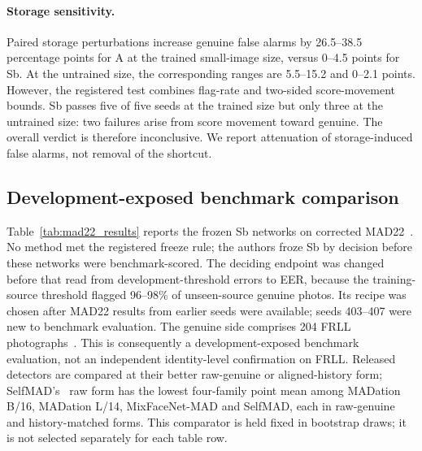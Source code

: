 \paragraph{Storage sensitivity.}
Paired storage perturbations increase genuine false alarms by 26.5--38.5 percentage points for A at the trained small-image size, versus 0--4.5 points for Sb. At the untrained size, the corresponding ranges are 5.5--15.2 and 0--2.1 points. However, the registered test combines flag-rate and two-sided score-movement bounds. Sb passes five of five seeds at the trained size but only three at the untrained size: two failures arise from score movement toward genuine. The overall verdict is therefore inconclusive. We report attenuation of storage-induced false alarms, not removal of the shortcut.

\subsection{Development-exposed benchmark comparison}
\label{sec:mad22_results}
Table~\ref{tab:mad22_results} reports the frozen Sb networks on corrected MAD22~\cite{huber2022synmad}. No method met the registered freeze rule; the authors froze Sb by decision before these networks were benchmark-scored. The deciding endpoint was changed before that read from development-threshold errors to EER, because the training-source threshold flagged 96--98\% of unseen-source genuine photos. Its recipe was chosen after MAD22 results from earlier seeds were available; seeds 403--407 were new to benchmark evaluation. The genuine side comprises 204 FRLL photographs~\cite{debruine2017frll}. This is consequently a development-exposed benchmark evaluation, not an independent identity-level confirmation on FRLL. Released detectors are compared at their better raw-genuine or aligned-history form; SelfMAD's~\cite{ivanovska2025selfmad} raw form has the lowest four-family point mean among MADation B/16, MADation L/14, MixFaceNet-MAD and SelfMAD, each in raw-genuine and history-matched forms. This comparator is held fixed in bootstrap draws; it is not selected separately for each table row.

